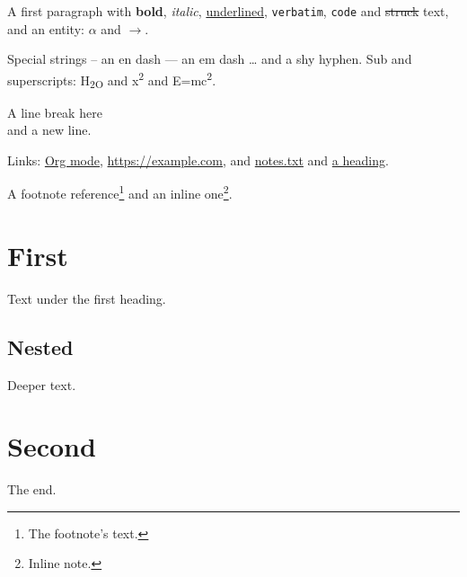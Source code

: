 A first paragraph with \textbf{bold}, \emph{italic}, \uline{underlined}, \texttt{verbatim},
\texttt{code} and \sout{struck} text, and an entity: \(\alpha\) and \(\rightarrow\).

Special strings -- an en dash --- an em dash \ldots{} and \- a shy hyphen.
Sub and superscripts: H\textsubscript{2O} and x\textsuperscript{2} and E=mc\textsuperscript{2}.

A line break here\\
and a new line.

Links: \href{https://orgmode.org}{Org mode}, \url{https://example.com}, and
\url{notes.txt} and \hyperref[sec:org7bfd295]{a heading}.

A footnote reference\footnote{The footnote's text.} and an inline one\footnote{Inline note.}.
\section{First}
\label{sec:orgaf3ed89}
Text under the first heading.
\subsection{Nested}
\label{sec:org1c59b52}
Deeper text.
\section{Second}
\label{sec:org7bfd295}
The end.
